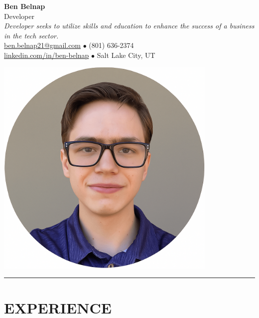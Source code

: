 \documentclass[11pt]{article}
\begin{document}
\begin{minipage}[t]{0.65\textwidth}
    {\Huge\color{primary}\textbf{Ben Belnap}}\\[6pt]
    {\Large\color{subtitle}Developer}\\[12pt]
    
    \textit{Developer seeks to utilize skills and education to enhance the success of a business in the tech sector.}\\[8pt]
    
    {\color{contact}
    \href{mailto:ben.belnap21@gmail.com}{ben.belnap21@gmail.com} $\bullet$ 
    (801) 636-2374\\
    \href{https://www.linkedin.com/in/ben-belnap}{linkedin.com/in/ben-belnap} $\bullet$ 
    Salt Lake City, UT
    }
\end{minipage}%
\hfill%
\begin{minipage}[t]{0.3\textwidth}
    \raggedleft
    \includegraphics[width=0.8\textwidth]{profile.png}
\end{minipage}

\vspace{12pt}
{\color{accent}\rule{\textwidth}{1pt}}
\vspace{6pt}

\section*{{\color{accent}EXPERIENCE}}
\end{document}
